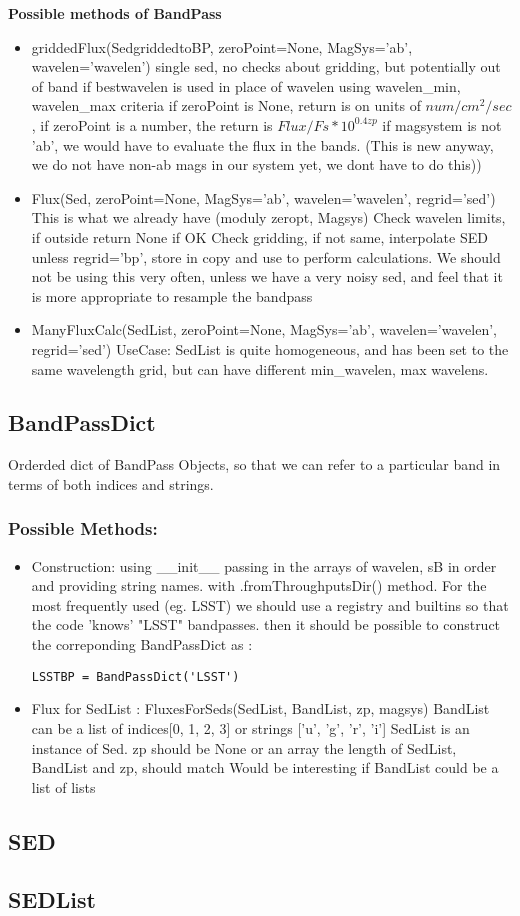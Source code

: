 \documentclass{article}[12pt]
\begin{document}
\textbf{Possible methods of BandPass}
\begin{itemize}
    \item griddedFlux(SedgriddedtoBP, zeroPoint=None, MagSys='ab', wavelen='wavelen') 
        single sed, no checks about gridding, but potentially out of band if bestwavelen is used in place of wavelen using wavelen_min, wavelen_max criteria
        if zeroPoint is None, return is on units of $num/cm^2/sec$, if zeroPoint is a number, the return is $Flux/ Fs * 10^{0.4 zp}$
        if magsystem is not 'ab', we would have to evaluate the flux in the bands. (This is new anyway, we do not have non-ab mags in our system yet, we dont have to do this))
    \item Flux(Sed, zeroPoint=None, MagSys='ab', wavelen='wavelen', regrid='sed') 
        This is what we already have (moduly zeropt, Magsys)
        Check wavelen limits, if outside return None  if OK
        Check gridding, if not same, interpolate SED unless regrid='bp', store in copy and use to perform calculations. We should not be using this very often,
       unless we have a very noisy sed, and feel that it is more appropriate to
       resample the bandpass 
   \item  ManyFluxCalc(SedList, zeroPoint=None, MagSys='ab', wavelen='wavelen', regrid='sed')
       UseCase: SedList is quite homogeneous, and has been set to the same wavelength grid, but can have different min_wavelen, max wavelens.  

\end{itemize}      
\subsection{BandPassDict}
    Orderded dict of BandPass Objects, so that we can refer to a particular band in terms of both indices and strings.
\subsubsection{Possible Methods:}
 \begin{itemize}
     \item Construction: using __init__ passing in the arrays of wavelen, sB in order and providing string names. with .fromThroughputsDir() method. For the most frequently used (eg. LSST) we should use a registry and builtins so that the code 'knows' "LSST" bandpasses. then it should be possible to construct the correponding BandPassDict as :
\begin{verbatim}
LSSTBP = BandPassDict('LSST')
\end{verbatim}
\item Flux for SedList :
    FluxesForSeds(SedList, BandList, zp, magsys)
    BandList can be a list of indices[0, 1, 2, 3] or strings ['u', 'g', 'r', 'i']
    SedList is an instance of Sed.
    zp should be None or an array
    the length of SedList, BandList and zp, should match
    Would be interesting if BandList could be a list of lists
    
\end{itemize}

\subsection{SED}
\subsection{SEDList}
\end{document}
